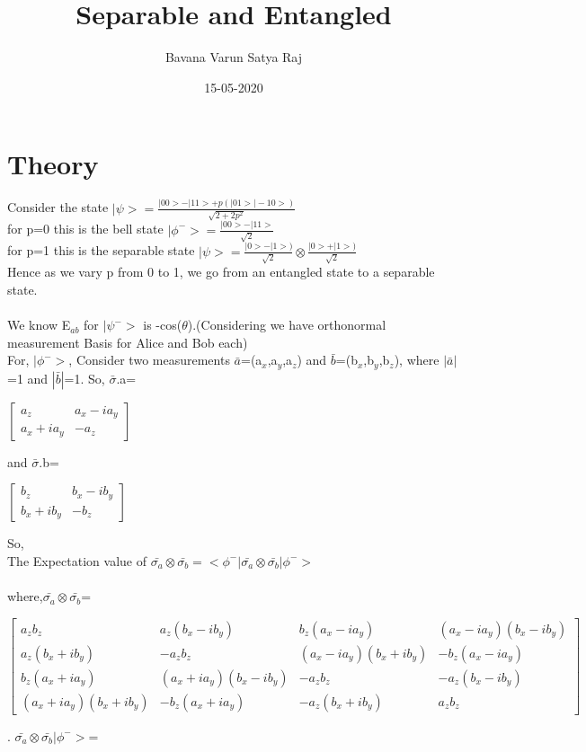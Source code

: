 \documentclass{article}
\title{Separable and Entangled}
\date{15-05-2020}
\author{Bavana Varun Satya Raj}
\begin{document}
  \maketitle
  \section*{Theory}
  Consider the state $|\psi>=\frac{|00>-|11>+p(|01>|-10>)}{\sqrt{2+2p^2}}$\\
  for p=0 this is the bell state $|\phi^->=\frac{|00>-|11>}{\sqrt{2}}$\\
  for p=1 this is the separable state $|\psi>=\frac{|0>-|1>)}{\sqrt{2}}\otimes\frac{|0>+|1>)}{\sqrt{2}}$\\
  Hence as we vary p from 0 to 1, we go from an entangled state to a	     	separable state.\\\\
  We know E$_{ab}$ for $|\psi^->$ is -cos($\theta$).(Considering we have orthonormal measurement Basis for Alice and Bob each)\\
  
  For, $|\phi^->$, Consider two measurements $\bar{a}$=(a$_x$,a$_y$,a$_z$) and $\bar{b}$=(b$_x$,b$_y$,b$_z$), where $|\bar{a}|$=1 and $|\bar{b}|$=1. So, $\bar{\sigma}$.a=\\
  
 \centerline{ $\begin{bmatrix}
  a_z & a_x-ia_y\\
  a_x+ia_y & -a_z
 \end{bmatrix}$}
 
 and $\bar{\sigma}$.b=\\
 
  \centerline{ $\begin{bmatrix}
  b_z & b_x-ib_y\\
  b_x+ib_y & -b_z
 \end{bmatrix}$}

 So,\\ 
 The Expectation value of $\bar{\sigma_a}\otimes\bar{\sigma_b}=<\phi^-|\bar{\sigma_a}\otimes\bar{\sigma_b}|\phi^->$\\\\
 where,$\bar{\sigma_a}\otimes\bar{\sigma_b}$=\\
 
 \centerline{ $\begin{bmatrix}
  a_zb_z & a_z(b_x-ib_y) & b_z(a_x-ia_y) & (a_x-ia_y)(b_x-ib_y) \\
  a_z(b_x+ib_y) & -a_zb_z & (a_x-ia_y)(b_x+ib_y) & -b_z(a_x-ia_y)\\ b_z(a_x+ia_y) & (a_x+ia_y)(b_x-ib_y) & -a_zb_z & -a_z(b_x-ib_y)\\
  (a_x+ia_y)(b_x+ib_y) & -b_z(a_x+ia_y) & -a_z(b_x+ib_y) & a_zb_z
 \end{bmatrix}$}
 .\newpage
 $\bar{\sigma_a}\otimes\bar{\sigma_b}|\phi^->$=\\
 
\end{document}
